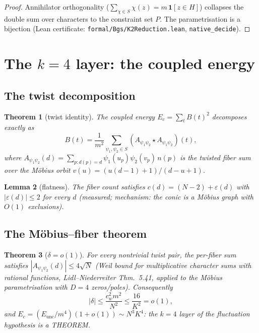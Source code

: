 \documentclass[11pt]{article}
\newtheorem{theorem}{Theorem}[section]
\newtheorem{lemma}[theorem]{Lemma}
\begin{document}
\begin{proof}
Annihilator orthogonality
($\sum_{\chi \in S}\chi(z) = m\,\mathbf{1}[z \in H]$) collapses the
double sum over characters to the constraint set $P$.  The
parametrisation is a bijection (Lean certificate:
\texttt{formal/Bgs/K2Reduction.lean}, \texttt{native\_decide}).
\end{proof}

\section{The \texorpdfstring{$k=4$}{k=4} layer: the coupled energy}
\label{sec:k4}

\subsection{The twist decomposition}

\begin{theorem}[twist identity]\label{thm:twist}
The coupled energy $E_c = \sum_t B(t)^2$ decomposes exactly as
\[
  B(t) = \frac{1}{m^2}\sum_{\psi_1,\psi_2 \in S}
  (A_{\psi_1\psi_2} \star A_{\psi_1\psi_2})(t),
\]
where $A_{\psi_1\psi_2}(d) = \sum_{p: d(p) = d}\psi_1(u_p)\psi_2(v_p)
\,n(p)$ is the twisted fiber sum over the M\"obius orbit
$v(u) = (u(d{-}1)+1)/(d{-}u+1)$.
\end{theorem}

\begin{lemma}[flatness]\label{lem:flatness}
The fiber count satisfies $c(d) = (N{-}2) + \varepsilon(d)$ with
$|\varepsilon(d)| \le 2$ for every $d$ (measured; mechanism: the
conic is a M\"obius graph with $O(1)$ exclusions).
\end{lemma}

\subsection{The M\"obius--fiber theorem}

\begin{theorem}[$\delta = o(1)$]\label{thm:mobius}
For every nontrivial twist pair, the per-fiber sum satisfies
$|A_{\psi_1\psi_2}(d)| \le 4\sqrt{N}$ (Weil bound for multiplicative
character sums with rational functions, Lidl--Niederreiter
Thm.~5.41, applied to the M\"obius parametrisation with $D = 4$
zeros/poles).  Consequently
\[
  |\delta| \le \frac{c_w^2 m^2}{N^2} \le \frac{16}{K^2} = o(1),
\]
and $E_c = (E_{\mathrm{unc}}/m^4)(1 + o(1)) \sim N^3 K^4$: the
$k{=}4$ layer of the fluctuation hypothesis is a THEOREM.
\end{theorem}
\end{document}
